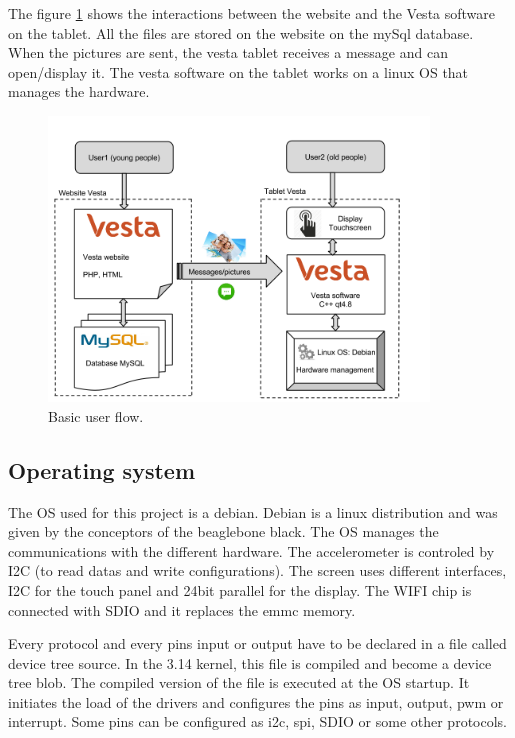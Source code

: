 The figure \ref{fig:user flow} shows the interactions between the website and the Vesta software on the tablet. All the files are stored on the website on the mySql database. When the pictures are sent, the vesta tablet receives a message and can open/display it. The vesta software on the tablet works on a linux OS that manages the hardware.

\begin{figure}[!htb]
    \centering
    \includegraphics[width=0.9\textwidth,keepaspectratio]{chap/softFig/block_diagram_vesta2.png}
    \caption{Basic user flow.}
    \label{fig:user flow}
\end{figure}

\subsection{Operating system}
The OS used for this project is a debian. Debian is a linux distribution and was given by the conceptors of the beaglebone black. The OS manages the communications with the different hardware. The accelerometer is controled by I2C (to read datas and write configurations). The screen uses different interfaces, I2C for the touch panel and 24bit parallel for the display. The WIFI chip is connected with SDIO and it replaces the emmc memory.

Every protocol and every pins input or output have to be declared in a file called device tree source. In the 3.14 kernel, this file is compiled and become a device tree blob. The compiled version of the file is executed at the OS startup. It initiates the load of the drivers and configures the pins as input, output, pwm or interrupt. Some pins can be configured as i2c, spi, SDIO or some other protocols.

